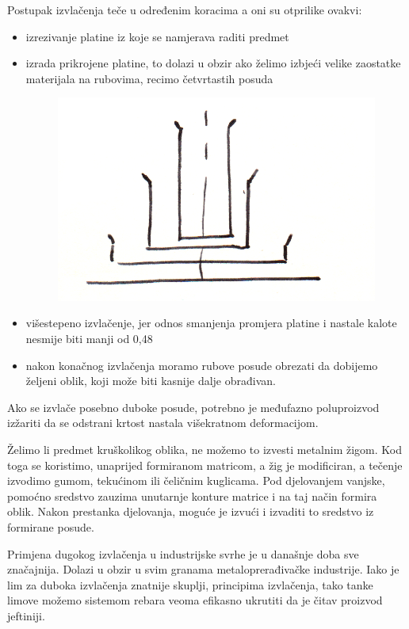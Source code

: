 \documentclass[a4paper,12pt]{article}
\numberwithin{figure}{section}
\begin{document}
Postupak izvlačenja teče u određenim koracima a oni su otprilike ovakvi:
\begin{itemize}
\item izrezivanje platine iz koje se namjerava raditi predmet
\item izrada prikrojene platine, to dolazi u obzir ako želimo izbjeći velike zaostatke materijala na rubovima, recimo četvrtastih posuda
\begin{figure}[!h]
\centering
\includegraphics[scale=0.15]{image_45-2.png}
\end{figure}
\FloatBarrier
\item višestepeno izvlačenje, jer odnos smanjenja promjera platine i nastale kalote nesmije biti manji od 0,48
\item nakon konačnog izvlačenja moramo rubove posude obrezati da dobijemo željeni oblik, koji može biti kasnije dalje obrađivan.
\end{itemize}
Ako se izvlače posebno duboke posude, potrebno je međufazno poluproizvod izžariti da se odstrani krtost nastala višekratnom deformacijom.\par
Želimo li predmet kruškolikog oblika, ne možemo to izvesti metalnim žigom. Kod toga se koristimo, unaprijed formiranom matricom, a žig je modificiran, a tečenje izvodimo gumom, tekućinom ili čeličnim kuglicama. Pod djelovanjem vanjske, pomoćno sredstvo zauzima unutarnje konture matrice i na taj način formira oblik. Nakon prestanka djelovanja, moguće je izvući i izvaditi to sredstvo iz formirane posude. \par
Primjena dugokog izvlačenja u industrijske svrhe je u današnje doba sve značajnija. Dolazi u obzir u svim granama metaloprerađivačke industrije. Iako je lim za duboka izvlačenja znatnije skuplji, principima izvlačenja, tako tanke limove možemo sistemom rebara veoma efikasno ukrutiti da je čitav proizvod jeftiniji.\par
\end{document}
